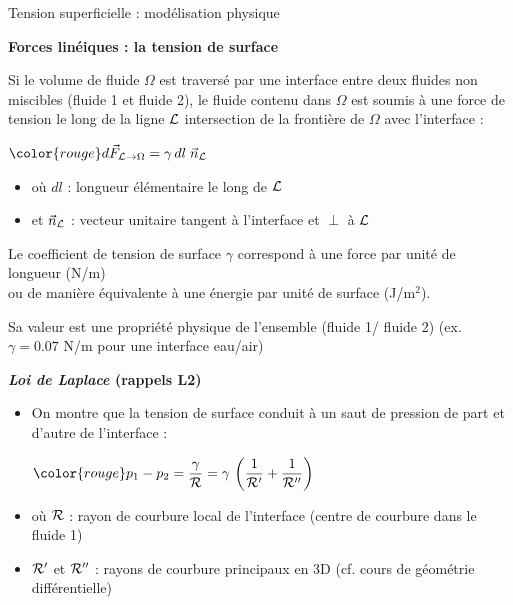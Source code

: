 \begin{frame}{Tension superficielle : modélisation physique}

\small

\textbf{Forces linéiques : la tension de surface} \medskip

Si le volume de fluide $\Omega$ est traversé par une interface entre deux fluides non miscibles (fluide 1 et fluide 2),
le fluide contenu dans $\Omega$ est soumis à une force de tension le long de la ligne $\cal L$
intersection de la frontière de $\Omega$ avec l'interface :

\medskip

\centerline{$ \color{rouge} \displaystyle d\myvec{F}_{{\cal L} \rightarrow \Omega}  = \gamma \, dl \; \myvec{n}_{\cal L} $}
\begin{itemize}
\item[]
	o{\`u} $dl$ : longueur élémentaire le long de $\cal L$
\item[]
	et $\vec{n}_{\cal L}$ : vecteur unitaire tangent à l'interface et $\perp$ à $\cal L$
\end{itemize}

\smallskip

\pause

Le coefficient de \textcolor{rouge}{tension de surface} $\gamma$ 
correspond à une force par unité de longueur (N/m) 
\\
ou de manière équivalente à une énergie par unité de surface (J/m$^2$).



\medskip

Sa valeur est une propriété physique de l'ensemble (fluide 1/ fluide 2)
(ex. $\gamma = 0.07$ N/m pour une interface eau/air)

\pause

\medskip

{\bf  \textsl{Loi de Laplace} (rappels L2)}


\begin{itemize}
\item[]
On montre que la tension de surface conduit à un saut de pression 
de part et d'autre de l'interface :

\centerline{$ \displaystyle \color{rouge} p_1 - p_2 = \frac{\gamma}{\cal R} 
                                      = \gamma \, \left (\frac{1}{\cal R'}+\frac{1}{\cal R''}\right)$}
\item[]
o{\`u} $\cal R$ : rayon de courbure local de l'interface (centre de courbure dans le fluide 1)
\item[]
 $\cal R'$ et $\cal R''$ : rayons de courbure principaux en 3D (cf. cours de géométrie différentielle)
\end{itemize}



\end{frame}
